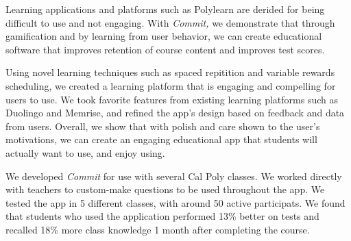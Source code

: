 \par Learning applications and platforms such as Polylearn are derided for being difficult to use and not engaging. With \textit{Commit,} we demonstrate that through gamification and by learning from user behavior, we can create educational software that improves retention of course content and improves test scores.

\par Using novel learning techniques such as spaced repitition and variable rewards scheduling, we created a learning platform that is engaging and compelling for users to use. We took favorite features from existing learning platforms such as Duolingo and Memrise, and refined the app's design based on feedback and data from users. Overall, we show that with polish and care shown to the user's motivations, we can create an engaging educational app that students will actually want to use, and enjoy using.

\par We developed \textit{Commit} for use with several Cal Poly classes. We worked directly with teachers to custom-make questions to be used throughout the app. We tested the app in 5 different classes, with around 50 active participats. We found that students who used the application performed 13\% better on tests and recalled 18\% more class knowledge 1 month after completing the course.